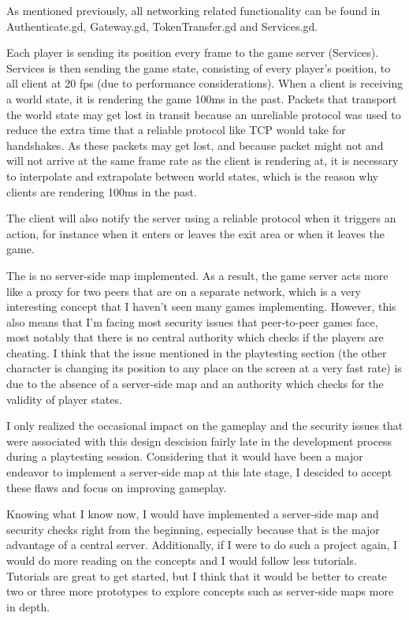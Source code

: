 \documentclass{article}
\begin{document}
As mentioned previously, all networking related functionality can be found in Authenticate.gd, Gateway.gd, TokenTransfer.gd and Services.gd.

Each player is sending its position every frame to the game server (Services). Services is then sending the game state, consisting of every player's position, to all client at 20 fps (due to performance considerations). When a client is receiving a world state, it is rendering the game 100ms in the past. Packets that transport the world state may get lost in transit because an unreliable protocol was used to reduce the extra time that a reliable protocol like TCP would take for handshakes. As these packets may get lost, and because packet might not and will not arrive at the same frame rate as the client is rendering at, it is necessary to interpolate and extrapolate between world states, which is the reason why clients are rendering 100ms in the past.

The client will also notify the server using a reliable protocol when it triggers an action, for instance when it enters or leaves the exit area or when it leaves the game.

The is no server-side map implemented. As a result, the game server acts more like a proxy for two peers that are on a separate network, which is a very interesting concept that I haven't seen many games implementing. However, this also means that I'm facing most security issues that peer-to-peer games face, most notably that there is no central authority which checks if the players are cheating. I think that the issue mentioned in the playtesting section (the other character is changing its position to any place on the screen at a very fast rate) is due to the absence of a server-side map and an authority which checks for the validity of player states. 

I only realized the occasional impact on the gameplay and the security issues that were associated with this design descision fairly late in the development process during a playtesting session. Considering that it would have been a major endeavor to implement a server-side map at this late stage, I descided to accept these flaws and focus on improving gameplay.

Knowing what I know now, I would have implemented a server-side map and security checks right from the beginning, especially because that is the major advantage of a central server. Additionally, if I were to do such a project again, I would do more reading on the concepts and I would follow less tutorials. Tutorials are great to get started, but I think that it would be better to create two or three more prototypes to explore concepts such as server-side maps more in depth.
\end{document}
